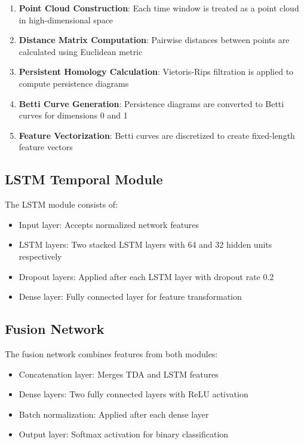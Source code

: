 \documentclass[conference]{IEEEtran}
\begin{document}
\begin{enumerate}
\item \textbf{Point Cloud Construction}: Each time window is treated as a point cloud in high-dimensional space
\item \textbf{Distance Matrix Computation}: Pairwise distances between points are calculated using Euclidean metric
\item \textbf{Persistent Homology Calculation}: Vietoris-Rips filtration is applied to compute persistence diagrams
\item \textbf{Betti Curve Generation}: Persistence diagrams are converted to Betti curves for dimensions 0 and 1
\item \textbf{Feature Vectorization}: Betti curves are discretized to create fixed-length feature vectors
\end{enumerate}

\subsection{LSTM Temporal Module}

The LSTM module consists of:

\begin{itemize}
\item Input layer: Accepts normalized network features
\item LSTM layers: Two stacked LSTM layers with 64 and 32 hidden units respectively
\item Dropout layers: Applied after each LSTM layer with dropout rate 0.2
\item Dense layer: Fully connected layer for feature transformation
\end{itemize}

\subsection{Fusion Network}

The fusion network combines features from both modules:

\begin{itemize}
\item Concatenation layer: Merges TDA and LSTM features
\item Dense layers: Two fully connected layers with ReLU activation
\item Batch normalization: Applied after each dense layer
\item Output layer: Softmax activation for binary classification
\end{itemize}
\end{document}
